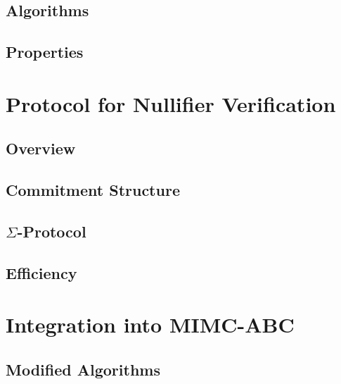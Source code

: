 \subsection{Algorithms}

\subsection{Properties}

\section{Protocol for Nullifier Verification}
\subsection{Overview}

\subsection{Commitment Structure}

\subsection{$\Sigma$-Protocol}


\subsection{Efficiency}






\section{Integration into MIMC-ABC}
\subsection{Modified Algorithms}

